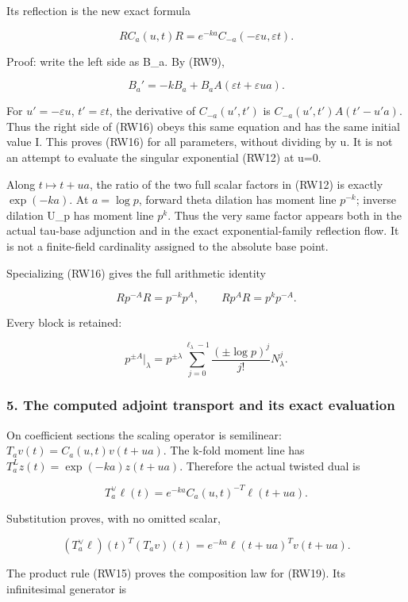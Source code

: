 Its reflection is the new exact formula

\[
\boxed{R C_a(u,t)R=e^{-ka}C_{-a}(-\varepsilon u,\varepsilon t).}
\tag{RW16}
\]

Proof: write the left side as B\_a. By (RW9),

\[
B_a'=-kB_a+B_aA(\varepsilon t+\varepsilon ua).
\]

For \(u'=-\varepsilon u\), \(t'=\varepsilon t\), the derivative of \(C_{-a}(u',t')\) is \(C_{-a}(u',t')A(t'-u' a)\). Thus the right side of (RW16) obeys this same equation and has the same initial value I. This proves (RW16) for all parameters, without dividing by u. It is not an attempt to evaluate the singular exponential (RW12) at u=0.

Along \(t\mapsto t+ua\), the ratio of the two full scalar factors in (RW12) is exactly \(\exp(-ka)\). At \(a=\log p\), forward theta dilation has moment line \(p^{-k}\); inverse dilation U\_p has moment line \(p^k\). Thus the very same factor appears both in the actual tau-base adjunction and in the exact exponential-family reflection flow. It is not a finite-field cardinality assigned to the absolute base point.

Specializing (RW16) gives the full arithmetic identity

\[
R p^{-A} R=p^{-k}p^A,
\qquad R p^A R=p^k p^{-A}.
\tag{RW17}
\]

Every block is retained:

\[
p^{\pm A}|_{\lambda}
=p^{\pm\lambda}\sum_{j=0}^{\ell_\lambda-1}
\frac{(\pm\log p)^j}{j!}N_\lambda^j.
\tag{RW18}
\]

\subsubsection{5. The computed adjoint transport and its exact evaluation}\label{endpoint-f1_reflection--the-computed-adjoint-transport-and-its-exact-evaluation}

On coefficient sections the scaling operator is semilinear: \(T_av(t)=C_a(u,t)v(t+ua)\). The k-fold moment line has \(T_a^Lz(t)=\exp(-ka)z(t+ua)\). Therefore the actual twisted dual is

\[
\boxed{T_a^\vee\ell(t)
=e^{-ka}C_a(u,t)^{-T}\ell(t+ua).}
\tag{RW19}
\]

Substitution proves, with no omitted scalar,

\[
(T_a^\vee\ell)(t)^T(T_av)(t)
=e^{-ka}\ell(t+ua)^Tv(t+ua).
\tag{RW20}
\]

The product rule (RW15) proves the composition law for (RW19). Its infinitesimal generator is

